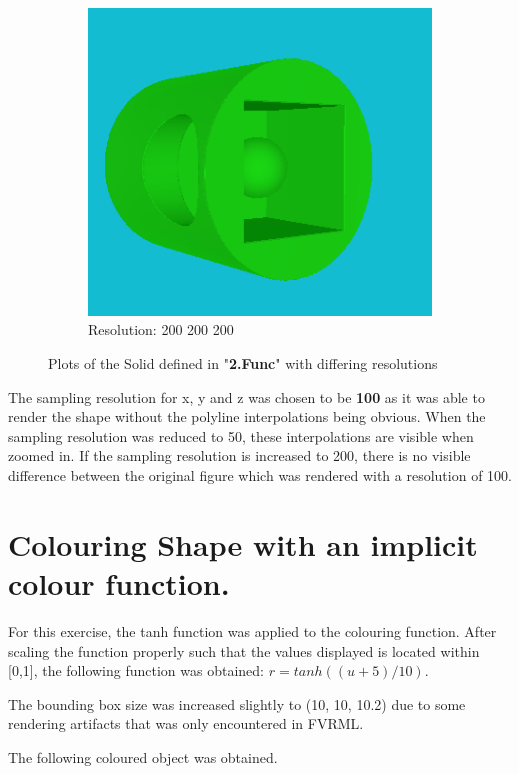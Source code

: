 \documentclass[acmlarge,nonacm=true]{acmart}
\begin{document}
\begin{figure}[H]
\begin{subfigure}{.33\textwidth}
		\includegraphics[width=.8\linewidth]{fig/2_200_200_200}
		\caption{Resolution: 200 200 200}
	  \end{subfigure}
	\caption{Plots of the Solid defined in "\textbf{2.Func}" with differing resolutions}
	\label{fig:2}
\end{figure}

The sampling resolution for x, y and z was chosen to be \textbf{100} as it was able to render the shape without the 
polyline interpolations being obvious. When the sampling resolution was reduced to 50, these interpolations are visible 
when zoomed in. If the sampling resolution is increased to 200, there is no visible difference between the original figure 
which was rendered with a resolution of 100.

\section{Colouring Shape with an implicit colour function.}
For this exercise, the tanh function was applied to the colouring function. After scaling the 
function properly such that the values displayed is located within [0,1], the following function
was obtained: $r=tanh((u+5)/10)$.

The bounding box size was increased slightly to (10, 10, 10.2) due to some rendering artifacts
that was only encountered in FVRML.

The following coloured object was obtained.
\end{document}
